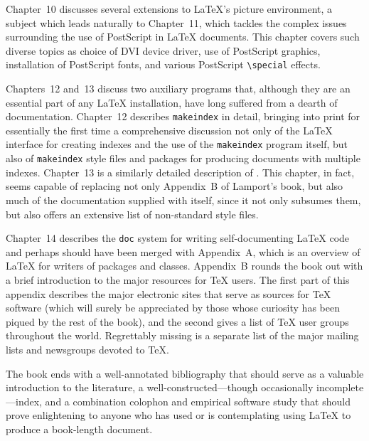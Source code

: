 Chapter~10 discusses several extensions to \LaTeX's picture
environment, a subject which leads naturally to Chapter~11, which
tackles the complex issues surrounding the use of PostScript in
\LaTeX{} documents.  This chapter covers such diverse topics as choice
of DVI device driver, use of PostScript graphics, installation of
PostScript fonts, and various PostScript \verb+\special+ effects.

Chapters~12 and~13 discuss two auxiliary programs that, although they
are an essential part of any \LaTeX{} installation, have long suffered
from a dearth of documentation.  Chapter~12 describes {\tt makeindex}
in detail, bringing into print for essentially the first time a
comprehensive discussion not only of the \LaTeX{} interface for
creating indexes and the use of the {\tt makeindex} program itself,
but also of {\tt makeindex} style files and packages for producing
documents with multiple indexes.  Chapter~13 is a similarly detailed
description of \BibTeX.  This chapter, in fact, seems capable of
replacing not only Appendix~B of Lamport's book, but also much of the
documentation supplied with \BibTeX{} itself, since it not only
subsumes them, but also offers an extensive list of non-standard
\BibTeX{} style files.

Chapter~14 describes the {\tt doc} system for writing self-documenting
\LaTeX{} code and perhaps should have been merged with Appendix~A,
which is an overview of \LaTeX{} for writers of packages and classes.
Appendix~B rounds the book out with a brief introduction to the major
resources for \TeX{} users.  The first part of this appendix describes
the major electronic sites that serve as sources for \TeX{} software
(which will surely be appreciated by those whose curiosity has been
piqued by the rest of the book), and the second gives a list of \TeX{}
user groups throughout the world.  Regrettably missing is a separate
list of the major mailing lists and newsgroups devoted to \TeX.

The book ends with a well-annotated bibliography that should serve as
a valuable introduction to the literature, a well-constructed---though
occasionally incomplete---index, and a combination colophon and
empirical software study that should prove enlightening to anyone who
has used or is contemplating using
\LaTeX{} to produce a book-length document.

